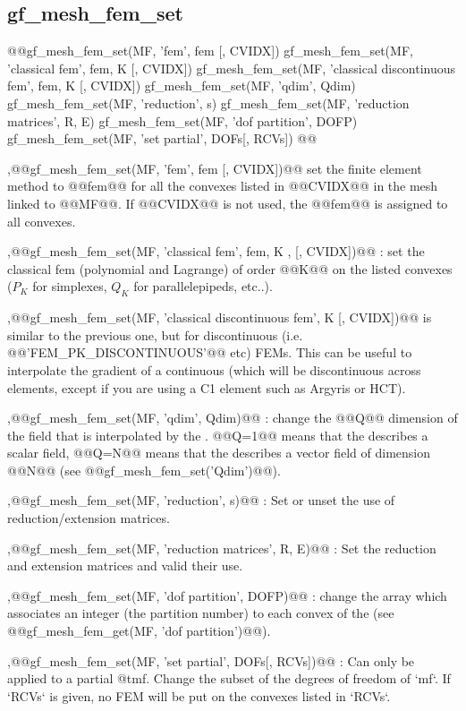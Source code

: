 \subsection{gf\_mesh\_fem\_set}
\begin{synopsis}
@@gf\_mesh\_fem\_set(MF, 'fem', \tfem fem [, \tivec CVIDX])
gf\_mesh\_fem\_set(MF, 'classical fem', \tfem fem, \tint K [, \tivec CVIDX])
gf\_mesh\_fem\_set(MF, 'classical discontinuous fem', \tfem fem, \tint K [, \tivec CVIDX])
gf\_mesh\_fem\_set(MF, 'qdim', \tint Qdim)
gf\_mesh\_fem\_set(MF, 'reduction', \tint s)
gf\_mesh\_fem\_set(MF, 'reduction matrices', \tspmat R, \tspmat E)
gf\_mesh\_fem\_set(MF, 'dof partition', \tivec DOFP)
gf\_mesh\_fem\_set(MF, 'set partial', \tivec DOFs[, \tivec RCVs])
@@\end{synopsis}
\begin{cmddescription}
  \sep{@@gf\_mesh\_fem\_set(MF, 'fem', fem [, CVIDX])@@} 
  set the finite element method to @@fem@@ for all
  the convexes listed in @@CVIDX@@ in the mesh linked to @@MF@@. If @@CVIDX@@ is not used,
  the @@fem@@ is assigned to all convexes. 
  
  \sep{@@gf\_mesh\_fem\_set(MF, 'classical fem', fem, K , [, CVIDX])@@} :
  set the classical fem (polynomial and Lagrange) of order @@K@@ on the
  listed convexes ($P_K$ for simplexes, $Q_K$ for parallelepipeds,
  etc..). 

  \sep{@@gf\_mesh\_fem\_set(MF, 'classical discontinuous fem', K [, CVIDX])@@} is
  similar to the previous one, but for discontinuous (i.e.
  @@'FEM_PK_DISCONTINUOUS'@@ etc) FEMs. This can be useful to
  interpolate the gradient of a continuous \tmf (which will be
  discontinuous across elements, except if you are using a C1 element
  such as Argyris or HCT).
  
  \sep{@@gf\_mesh\_fem\_set(MF, 'qdim', Qdim)@@} : 
  change the @@Q@@ dimension of the field that is interpolated by the \tmf.
  @@Q=1@@ means that the \tmf describes a scalar field, @@Q=N@@ means
  that the \tmf describes a vector field of dimension @@N@@ (see @@gf_mesh_fem_set('Qdim')@@).

  \sep{@@gf\_mesh\_fem\_set(MF, 'reduction', s)@@} :
  Set or unset the use of reduction/extension matrices.

  \sep{@@gf\_mesh\_fem\_set(MF, 'reduction matrices', R, E)@@} :
  Set the reduction and extension matrices and valid their use.

  \sep{@@gf\_mesh\_fem\_set(MF, 'dof partition', \tivec DOFP)@@} : 
  change the array which associates an integer (the partition number) to each convex of
  the \tmf (see @@gf\_mesh\_fem\_get(MF, 'dof partition')@@).

  \sep{@@gf\_mesh\_fem\_set(MF, 'set partial', \tivec DOFs[, \tivec RCVs])@@} :
  Can only be applied to a partial @tmf. Change the subset of the
  degrees of freedom of `mf`.
  If `RCVs` is given, no FEM will be put on the convexes listed in `RCVs`.
\end{cmddescription}
